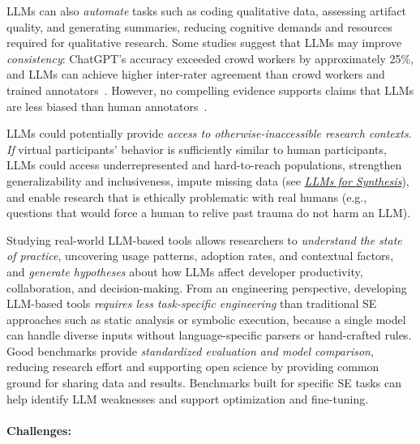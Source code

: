\documentclass[smallextended]{svjour3}
\newcommand{\synthesis}{\hyperref[sec:llms-for-synthesis]{\emph{LLMs for Synthesis}}\xspace}
\newcommand{\synthesis}{\href{/study-types\#llms-for-synthesis}{\emph{LLMs for Synthesis}}\xspace}
\newcommand{\studytypeparagraph}[1]{\paragraph{\bfseries #1:}}
\newcommand{\studytypeparagraph}[1]{\subsubsection{#1}}
\begin{document}
LLMs can also \emph{automate} tasks such as coding qualitative data, assessing artifact quality, and generating summaries, reducing cognitive demands and resources required for qualitative research. Some studies suggest that LLMs may improve \emph{consistency}: ChatGPT's accuracy exceeded crowd workers by approximately 25\%, and LLMs can achieve higher inter-rater agreement than crowd workers and trained annotators~\cite{DBLP:journals/corr/abs-2303-15056}. However, no compelling evidence supports claims that LLMs are less biased than human annotators~\cite{DBLP:journals/corr/abs-2303-15056}.

LLMs could potentially provide \emph{access to otherwise-inaccessible research contexts}. \textit{If} virtual participants' behavior is sufficiently similar to human participants, LLMs could access underrepresented and hard-to-reach populations, strengthen generalizability and inclusiveness, impute missing data (see \synthesis), and enable research that is ethically problematic with real humans (e.g., questions that would force a human to relive past trauma do not harm an LLM).

Studying real-world LLM-based tools allows researchers to \emph{understand the state of practice}, uncovering usage patterns, adoption rates, and contextual factors, and \emph{generate hypotheses} about how LLMs affect developer productivity, collaboration, and decision-making. From an engineering perspective, developing LLM-based tools \emph{requires less task-specific engineering} than traditional SE approaches such as static analysis or symbolic execution, because a single model can handle diverse inputs without language-specific parsers or hand-crafted rules. Good benchmarks provide \emph{standardized evaluation and model comparison}, reducing research effort and supporting open science by providing common ground for sharing data and results. Benchmarks built for specific SE tasks can help identify LLM weaknesses and support optimization and fine-tuning.

\studytypeparagraph{Challenges}
\end{document}
